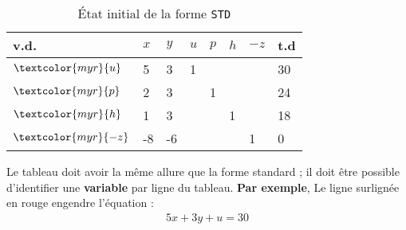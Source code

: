 \documentclass{report}
\begin{document}
\begin{multicols*}{2}
        \begin{table}[H]
                \begin{center}
                    \renewcommand{\arraystretch}{1.5}
                    \selectfont
                    \footnotesize
                        \begin{tabular}{|l|l l l l l |l|l|}
                        \arrayrulecolor{blue}
                        \hline
                        v.d. & $x$
                             & $y$ & $u$ & $p$ & $h$ & $-z$ & t.d 
                        \\
                        \hline
                        \arrayrulecolor{black}
                        \rowcolor{myr!40}
                        $\textcolor{myr}{u} 
                        $     & 5
                                & 3
                                & 1
                                & 
                                & &  &  30
                        \\
                        $\textcolor{myr}{p} $     
                               & 2
                               & 3
                               & & 1
                               & & & 24 
                        \\
                        $\textcolor{myr}{h} $     
                               & 1
                               & 3 
                               &  & 
                               &  1
                               & & 18 
                        \\ 
                        \hline
                        $\textcolor{myr}{-z}$ 
                                & -8
                                & -6
                                & 
                                & 
                                & 
                                & 1 & 0 
                        \\
                        \hline 



                        \end{tabular}
                \end{center}
        \caption{État initial de la forme \texttt{STD}}
        \end{table}         
Le tableau doit avoir la même allure que la forme standard ; 
il doit être possible d'identifier une \textbf{variable} par 
ligne du tableau. \textbf{Par exemple}, Le ligne surlignée en rouge engendre  
l'équation : 
\begin{align*}
        5x  + 3y + u = 30
\end{align*}


\end{multicols*}
\end{document}
